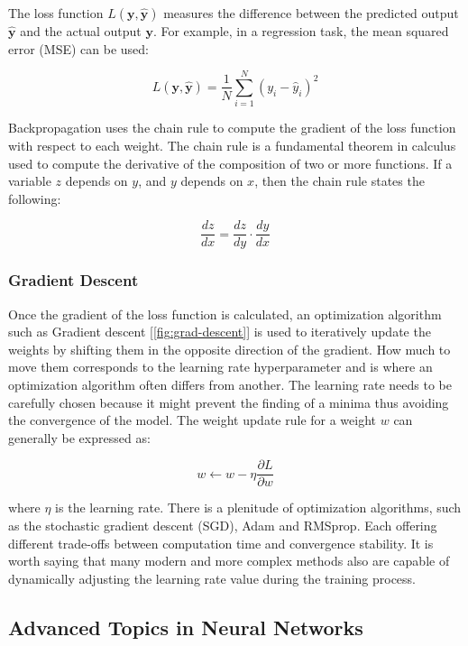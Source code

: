 \documentclass[../Thesis.tex]{subfiles}
\begin{document}
	The loss function \(L(\mathbf{y}, \mathbf{\hat{y}})\) measures the difference between the predicted output \(\mathbf{\hat{y}}\) and the actual output \(\mathbf{y}\). For example, in a regression task, the mean squared error (MSE) can be used:
	
	\[
	L(\mathbf{y}, \mathbf{\hat{y}}) = \frac{1}{N} \sum_{i=1}^{N} (y_i - \hat{y}_i)^2
	\]
	
	Backpropagation uses the chain rule to compute the gradient of the loss function with respect to each weight. The chain rule is a fundamental theorem in calculus used to compute the derivative of the composition of two or more functions. If a variable \(z\) depends on \(y\), and \(y\) depends on \(x\), then the chain rule states the following:
	
	\[
	\frac{dz}{dx} = \frac{dz}{dy} \cdot \frac{dy}{dx}
	\]
	
	
	
	\subsubsection{Gradient Descent}
		
	Once the gradient of the loss function is calculated, an optimization algorithm such as Gradient descent [\autoref{fig:grad-descent}] is used to iteratively update the weights by shifting them in the opposite direction of the gradient. How much to move them corresponds to the learning rate hyperparameter and is where an optimization algorithm often differs from another. The learning rate needs to be carefully chosen because it might prevent the finding of a minima thus avoiding the convergence of the model. The weight update rule for a weight \(w\) can generally be expressed as:
	
	\[
	w \leftarrow w - \eta \frac{\partial L}{\partial w}
	\]
	
	where \(\eta\) is the learning rate. There is a plenitude of optimization algorithms, such as the stochastic gradient descent (SGD), Adam and RMSprop. Each offering different trade-offs between computation time and convergence stability. It is worth saying that many modern and more complex methods also are capable of dynamically adjusting the learning rate value during the training process.
	
	
	
	\subsection{Advanced Topics in Neural Networks}
	
\end{document}
